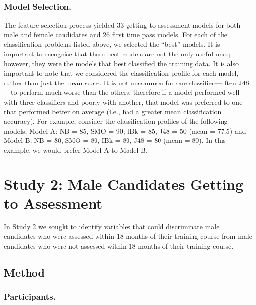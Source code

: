 \documentclass[
  12pt,
  a4paper,
]{book}
\begin{document}
\hypertarget{model-selection.}{%
\subsubsection{Model Selection.}\label{model-selection.}}

The feature selection process yielded 33 getting to assessment models for both male and female candidates and 26 first time pass models. For each of the classification problems listed above, we selected the ``best'' models. It is important to recognise that these best models are not the only useful ones; however, they were the models that best classified the training data. It is also important to note that we considered the classification profile for each model, rather than just the mean score. It is not uncommon for one classifier---often J48---to perform much worse than the others, therefore if a model performed well with three classifiers and poorly with another, that model was preferred to one that performed better on average (i.e., had a greater mean classification accuracy). For example, consider the classification profiles of the following models, Model A: NB = 85, SMO = 90, IBk = 85, J48 = 50 (mean = 77.5) and Model B: NB = 80, SMO = 80, IBk = 80, J48 = 80 (mean = 80). In this example, we would prefer Model A to Model B.

\hypertarget{male-gta}{%
\section{Study 2: Male Candidates Getting to Assessment}\label{male-gta}}

In Study 2 we sought to identify variables that could discriminate male candidates who were assessed within 18 months of their training course from male candidates who were not assessed within 18 months of their training course.

\hypertarget{male-gta-method}{%
\subsection{Method}\label{male-gta-method}}

\hypertarget{male-gta-participants}{%
\subsubsection{Participants.}\label{male-gta-participants}}
\end{document}
